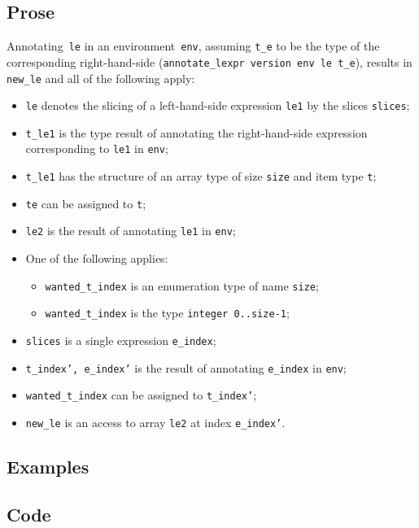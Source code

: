\documentclass{book}
\begin{document}
  \subsection{Prose}
   Annotating~\texttt{le} in an environment~\texttt{env}, assuming
\texttt{t\_e} to be the type of the corresponding right-hand-side
(\texttt{annotate\_lexpr version env le t\_e}), results in \texttt{new\_le} and
all of the following apply:
   \begin{itemize}
   \item \texttt{le} denotes the slicing of a left-hand-side expression \texttt{le1} by the slices \texttt{slices};
   \item \texttt{t\_le1} is the type result of annotating the right-hand-side expression corresponding to \texttt{le1} in \texttt{env};
   \item \texttt{t\_le1} has the structure of an array type of size \texttt{size} and item type \texttt{t};
   \item \texttt{te} can be assigned to \texttt{t};
   \item \texttt{le2} is the result of annotating \texttt{le1} in \texttt{env};
   \item One of the following applies:
     \begin{itemize}
     \item \texttt{wanted\_t\_index} is an enumeration type of name \texttt{size};
     \item \texttt{wanted\_t\_index} is the type \texttt{integer {0..size-1}};
     \end{itemize}
   \item \texttt{slices} is a single expression \texttt{e\_index};
   \item \texttt{t\_index', e\_index'} is the result of annotating \texttt{e\_index} in \texttt{env};
   \item \texttt{wanted\_t\_index} can be assigned to \texttt{t\_index'};
   \item \texttt{new\_le} is an access to array \texttt{le2} at index \texttt{e\_index'}.  
   \end{itemize}

  \subsection{Examples}

  \subsection{Code}
\end{document}
